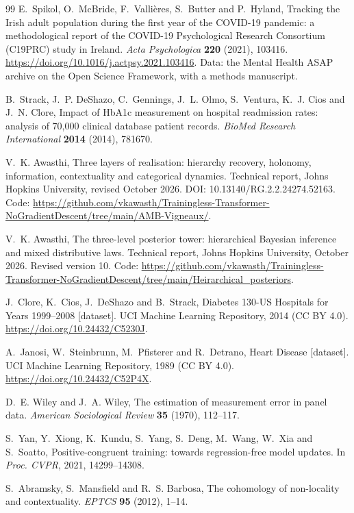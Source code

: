 \documentclass[11pt]{article}
\theoremstyle{definition}
\theoremstyle{remark}
\begin{document}
\begin{thebibliography}{99}
E.~Spikol, O.~McBride, F.~Valli\`eres, S.~Butter and P.~Hyland, Tracking the Irish adult population during the first year of the
COVID-19 pandemic: a methodological report of the COVID-19 Psychological Research Consortium (C19PRC) study in Ireland.
\emph{Acta Psychologica} \textbf{220} (2021), 103416. \url{https://doi.org/10.1016/j.actpsy.2021.103416}. Data: the Mental Health ASAP archive on
the Open Science Framework, with a methods manuscript.

B.~Strack, J.~P. DeShazo, C.~Gennings, J.~L. Olmo, S.~Ventura, K.~J. Cios and J.~N. Clore, Impact of HbA1c measurement on hospital
readmission rates: analysis of 70{,}000 clinical database patient records. \emph{BioMed Research International} \textbf{2014} (2014), 781670.

V.~K. Awasthi, Three layers of realisation: hierarchy recovery, holonomy, information, contextuality and categorical
dynamics. Technical report, Johns Hopkins University, revised October 2026. DOI: 10.13140/RG.2.2.24274.52163. Code: \url{https://github.com/vkawasth/Trainingless-Transformer-NoGradientDescent/tree/main/AMB-Vigneaux/}.

V.~K. Awasthi, The three-level posterior tower: hierarchical {B}ayesian inference and mixed distributive laws.
Technical report, Johns Hopkins University, October 2026. Revised version 10. Code: \url{https://github.com/vkawasth/Trainingless-Transformer-NoGradientDescent/tree/main/Heirarchical_posteriors}.

J.~Clore, K.~Cios, J.~DeShazo and B.~Strack, Diabetes 130-US Hospitals for Years 1999--2008 [dataset]. UCI Machine Learning
Repository, 2014 (CC BY 4.0). \url{https://doi.org/10.24432/C5230J}.

A.~Janosi, W.~Steinbrunn, M.~Pfisterer and R.~Detrano, Heart Disease [dataset]. UCI Machine Learning Repository, 1989 (CC BY 4.0).
\url{https://doi.org/10.24432/C52P4X}.

D.~E. Wiley and J.~A. Wiley, The estimation of measurement error in panel data. \emph{American Sociological Review} \textbf{35} (1970),
112--117.

S.~Yan, Y.~Xiong, K.~Kundu, S.~Yang, S.~Deng, M.~Wang, W.~Xia and S.~Soatto, Positive-congruent training: towards regression-free model
updates. In \emph{Proc. CVPR}, 2021, 14299--14308.

S.~Abramsky, S.~Mansfield and R.~S. Barbosa, The cohomology of non-locality and contextuality. \emph{EPTCS} \textbf{95} (2012), 1--14.


\end{thebibliography}
\end{document}

